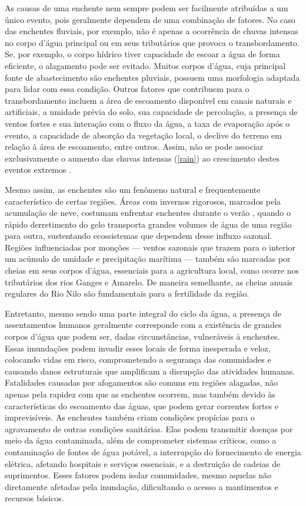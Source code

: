 As causas de uma enchente nem sempre podem ser facilmente atribuídas a um único evento, pois geralmente dependem de uma
combinação de fatores. No caso das enchentes fluviais, por exemplo, não é apenas a ocorrência de chuvas intensas no
corpo d'água principal ou em seus tributários que provoca o transbordamento. Se, por exemplo, o corpo hídrico tiver
capacidade de escoar a água de forma eficiente, o alagamento pode ser evitado. Muitos corpos d'água, cuja principal
fonte de abastecimento são enchentes pluviais, possuem uma morfologia adaptada para lidar com essa condição. Outros
fatores que contribuem para o transbordamento incluem a área de escoamento disponível em canais naturais e artificiais,
a umidade prévia do solo, sua capacidade de percolação, a presença de ventos fortes e sua interação com o fluxo da água,
a taxa de evaporação após o evento, a capacidade de absorção da vegetação local, o declive do terreno em relação à área
de escoamento, entre outros. Assim, não se pode associar exclusivamente o aumento das chuvas intensas (\autoref{rain})
ao crescimento destes eventos extremos \cite{ipcc_ar6_wg2_chap11}.

Mesmo assim, as enchentes são um fenômeno natural e frequentemente característico de certas regiões. Áreas com invernos
rigorosos, marcados pela acumulação de neve, costumam enfrentar enchentes durante o verão \cite{atashi}, quando o rápido
derretimento do gelo transporta grandes volumes de água de uma região para outra, sustentando ecossistemas que dependem
desse influxo sazonal. Regiões influenciadas por monções — ventos sazonais que trazem para o interior um acúmulo de
umidade e precipitação marítima — também são marcadas por cheias em seus corpos d'água, essenciais para a agricultura
local, como ocorre nos tributários dos rios Ganges e Amarelo. De maneira semelhante, as cheias anuais regulares do Rio
Nilo são fundamentais para a fertilidade da região. 

Entretanto, mesmo sendo uma parte integral do ciclo da água, a presença de assentamentos humanos geralmente corresponde
com a existência de grandes corpos d'água que podem ser, dadas circunstâncias, vulneráveis à enchentes. Essas imundações
podem invadir esses locais de forma inesperada e veloz, colocando vidas em risco, comprometendo a segurança das
comunidades e causando danos estruturais que amplificam a disrupção das atividades humanas. Fatalidades causadas por
afogamentos são comuns em regiões alagadas, não apenas pela rapidez com que as enchentes ocorrem, mas também devido às
características do escoamento das águas, que podem gerar correntes fortes e imprevisíveis. As enchentes também criam
condições propícias para o agravamento de outras condições sanitárias. Elas podem transmitir doenças por meio da água
contaminada, além de comprometer sistemas críticos, como a contaminação de fontes de água potável, a interrupção do
fornecimento de energia elétrica, afetando hospitais e serviços essenciais, e a destruição de cadeias de suprimentos.
Esses fatores podem isolar comunidades, mesmo aquelas não diretamente afetadas pela inundação, dificultando o acesso a
mantimentos e recursos básicos.

